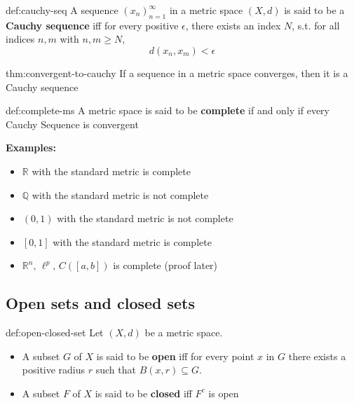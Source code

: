 \documentclass[landscape, 8pt]{extarticle}
\begin{document}
\begin{multicols}{3}
\begin{dfn}{def:cauchy-seq}{}
    A sequence $(x_{n})^{\infty}_{n=1}$ in a metric space $(X,d)$ is said to be a \textbf{Cauchy sequence} iff for every positive $\epsilon$, there exists an index $N$, s.t. for all indices $n,m$ with $n,m\ge N$,
    \[d(x_{n}, x_{m}) < \epsilon\]
\end{dfn}

\begin{thm}[]{thm:convergent-to-cauchy}{}
    If a sequence in a metric space converges, then it is a Cauchy sequence
\end{thm}


\begin{dfn}{def:complete-ms}{}
    A metric space is said to be \textbf{complete} if and only if every Cauchy Sequence is convergent
\end{dfn}

\textbf{Examples:}
\begin{itemize}
    \item $\mathbb{R}$ with the standard metric is complete
    \item $\mathbb{Q}$ with the standard metric is not complete
    \item $(0,1)$ with the standard metric is not complete
    \item $[0,1]$ with the standard metric is complete
    \item $\mathbb{R}^{n},\,\ell^{p},\,C([a,b])$ is complete (proof later)
\end{itemize} 

\subsection{Open sets and closed sets}

\begin{dfn}{def:open-closed-set}{}
    Let $(X,d)$ be a metric space.
    \begin{itemize}
        \item A subset $G$ of $X$ is said to be \textbf{open} iff for every point $x$ in $G$ there exists a positive radius $r$ such that $B(x,r)\subseteq G$.
        \item A subset $F$ of $X$ is said to be \textbf{closed} iff $F^{c}$ is open
    \end{itemize}
\end{dfn}


\end{multicols}
\end{document}
